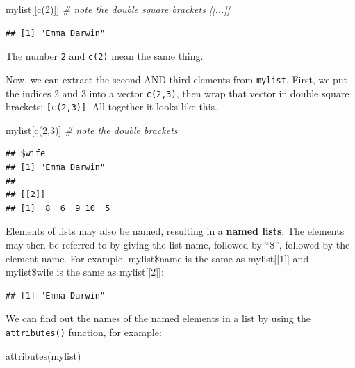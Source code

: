 \documentclass[
]{book}
\newenvironment{Shaded}{\begin{snugshade}}{\end{snugshade}}
\newcommand{\CommentTok}[1]{\textcolor[rgb]{0.56,0.35,0.01}{\textit{#1}}}
\newcommand{\DecValTok}[1]{\textcolor[rgb]{0.00,0.00,0.81}{#1}}
\newcommand{\FunctionTok}[1]{\textcolor[rgb]{0.00,0.00,0.00}{#1}}
\newcommand{\NormalTok}[1]{#1}
\newcommand{\SpecialCharTok}[1]{\textcolor[rgb]{0.00,0.00,0.00}{#1}}
\begin{document}
\begin{Shaded}
\begin{Highlighting}[]
\NormalTok{mylist[[}\FunctionTok{c}\NormalTok{(}\DecValTok{2}\NormalTok{)]]  }\CommentTok{\# note the double square brackets [[...]]}
\end{Highlighting}
\end{Shaded}

\begin{verbatim}
## [1] "Emma Darwin"
\end{verbatim}

The number \texttt{2} and \texttt{c(2)} mean the same thing.

Now, we can extract the second AND third elements from \texttt{mylist}. First, we put the indices 2 and 3 into a vector \texttt{c(2,3)}, then wrap that vector in double square brackets: \texttt{{[}c(2,3){]}}. All together it looks like this.

\begin{Shaded}
\begin{Highlighting}[]
\NormalTok{mylist[}\FunctionTok{c}\NormalTok{(}\DecValTok{2}\NormalTok{,}\DecValTok{3}\NormalTok{)] }\CommentTok{\# note the double brackets}
\end{Highlighting}
\end{Shaded}

\begin{verbatim}
## $wife
## [1] "Emma Darwin"
## 
## [[2]]
## [1]  8  6  9 10  5
\end{verbatim}

Elements of lists may also be named, resulting in a \textbf{named lists}. The elements may then be referred to by giving the list name, followed by ``\$'', followed by the element name. For example, mylist\$name is the same as mylist{[}{[}1{]}{]} and mylist\$wife is the same as mylist{[}{[}2{]}{]}:

\begin{Shaded}
\end{Shaded}

\begin{verbatim}
## [1] "Emma Darwin"
\end{verbatim}

We can find out the names of the named elements in a list by using the \texttt{attributes()} function, for example:

\begin{Shaded}
\begin{Highlighting}[]
\FunctionTok{attributes}\NormalTok{(mylist)}
\end{Highlighting}
\end{Shaded}
\end{document}
